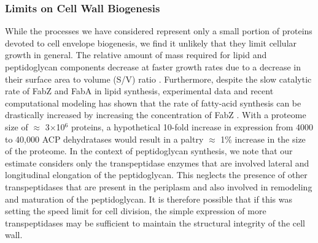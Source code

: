 \subsubsection{Limits on Cell Wall Biogenesis}
While the processes we have considered represent only a small portion of
proteins devoted to cell envelope biogenesis, we find it unlikely that they
limit cellular growth in general. The relative amount of mass required for
lipid and peptidoglycan components decrease at faster growth rates due to a
decrease in their surface area to volume (S/V) ratio \citep{ojkic2019}.
Furthermore, despite the slow catalytic rate of FabZ and FabA in lipid
synthesis, experimental data and recent computational modeling has shown that
the rate of fatty-acid synthesis can be drastically increased by increasing
the concentration of FabZ \citep{yu2011, ruppe2018}. With a proteome size of
$\approx$ 3$\times$10$^6$ proteins, a hypothetical 10-fold increase in
expression from 4000 to 40,000 ACP dehydratases would result in a paltry
$\approx$ 1\% increase in the size of the proteome. In the context of
peptidoglycan synthesis, we note that our estimate considers only the
transpeptidase enzymes that are involved lateral and longitudinal elongation
of the peptidoglycan. This neglects the presence of other transpeptidases
that are present in the periplasm and also involved in remodeling and
maturation of the peptidoglycan. It is therefore possible that if this was
setting the speed limit for cell division, the simple expression of more
transpeptidases may be sufficient to maintain the structural integrity of the
cell wall.

